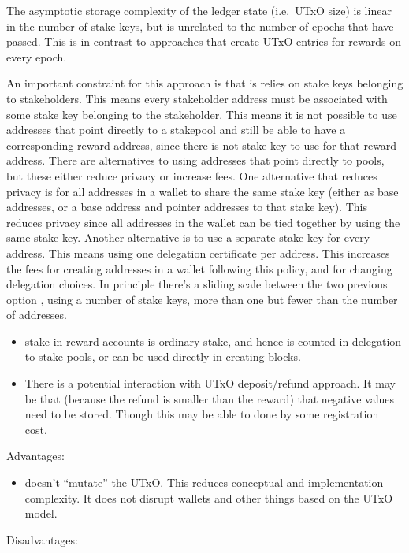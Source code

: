 \documentclass[11pt,a4paper]{article}
\begin{document}
The asymptotic storage complexity of the ledger state (i.e.~UTxO size)
is linear in the number of stake keys, but is unrelated to the number of
epochs that have passed. This is in contrast to approaches that create
UTxO entries for rewards on every epoch.

An important constraint for this approach is that is relies on stake
keys belonging to stakeholders. This means every stakeholder address
must be associated with some stake key belonging to the stakeholder.
This means it is not possible to use addresses that point directly to a
stakepool and still be able to have a corresponding reward address,
since there is not stake key to use for that reward address. There are
alternatives to using addresses that point directly to pools, but these
either reduce privacy or increase fees. One alternative that reduces
privacy is for all addresses in a wallet to share the same stake key
(either as base addresses, or a base address and pointer addresses to
that stake key). This reduces privacy since all addresses in the wallet
can be tied together by using the same stake key. Another alternative is
to use a separate stake key for every address. This means using one
delegation certificate per address. This increases the fees for creating
addresses in a wallet following this policy, and for changing delegation
choices. In principle there's a sliding scale between the two previous
option , using a number of stake keys, more than one but fewer than the
number of addresses.

\begin{itemize}
\item
  stake in reward accounts is ordinary stake, and hence is counted in
  delegation to stake pools, or can be used directly in creating blocks.
\item
  There is a potential interaction with UTxO deposit/refund approach. It
  may be that (because the refund is smaller than the reward) that
  negative values need to be stored. Though this may be able to done by
  some registration cost.
\end{itemize}

Advantages:

\begin{itemize}
\item
  doesn't ``mutate'' the UTxO. This reduces conceptual and
  implementation complexity. It does not disrupt wallets and other
  things based on the UTxO model.
\end{itemize}

Disadvantages:
\end{document}
